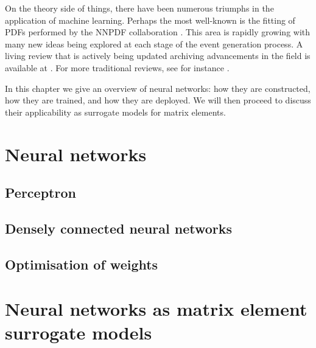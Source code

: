 \documentclass[main.tex]{subfiles}
\begin{document}
    On the theory side of things, there have been numerous
    triumphs in the application of machine learning.
    Perhaps the most well-known is the fitting
    of PDFs performed by the NNPDF collaboration \cite{NNPDF:2021njg}.
    This area is rapidly growing with many new
    ideas being explored at each stage of the event
    generation process.
    A living review that is actively being updated
    archiving advancements in the field is available
    at \cite{Feickert:2021ajf}.
    For more traditional reviews, see for instance
    \cite{Guest:2018yhq,Radovic:2018dip,Butter:2022rso}.

    In this chapter we give an overview of neural
    networks: how they are constructed, how
    they are trained, and how they are deployed.
    We will then proceed to discuss their
    applicability as surrogate models for matrix
    elements.

\section{Neural networks}
\subsection{Perceptron}
\subsection{Densely connected neural networks}
\subsection{Optimisation of weights}
\section{Neural networks as matrix element surrogate models}
\end{document}
